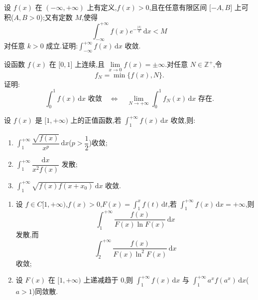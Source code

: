 \documentclass[../../数学分析培优讲义.tex]{subfiles}
\begin{document}
\begin{example}
设 $f(x)$ 在 $(-\infty,+\infty)$ 上有定义,$f(x)>0$,且在任意有限区间 $\lbrack -A,B\rbrack$ 上可积($A,B>0$);又有定数 $M$,使得
\[
    \int_{-\infty}^{+\infty}f(x)e^{-\frac{|x|}{k}}\,\mathrm{d}x<M
\]
对任意 $k>0$ 成立.证明:$\displaystyle\int_{-\infty}^{+\infty}f(x)\,\mathrm{d}x$ 收敛.
\end{example}
\exampleblank

\begin{example}
设函数 $f(x)$ 在 $\lbrack 0,1\rbrack$ 上连续,且 $\displaystyle\lim\limits_{x\to0}f(x)=\pm\infty$.对任意 $N\in\mathbb{Z}^+$,令
\[
    f_N=\min\{f(x),N\}.
\]
证明:
\[
    \int_0^1f(x)\,\mathrm{d}x\text{ 收敛}
    \quad\Longleftrightarrow\quad
    \lim\limits_{N\to+\infty}\int_0^1f_N(x)\,\mathrm{d}x\text{ 存在}.
\]
\end{example}
\exampleblank

\begin{example}
设 $f(x)$ 是 $\lbrack 1,+\infty)$ 上的正值函数,若 $\displaystyle\int_1^{+\infty}f(x)\,\mathrm{d}x$ 收敛,则:
\begin{enumerate}[label=(\arabic*)]
    \item $\displaystyle\int_1^{+\infty}\dfrac{\sqrt{f(x)}}{x^p}\,\mathrm{d}x$($p>\dfrac{1}{2}$)收敛;
    \item $\displaystyle\int_1^{+\infty}\dfrac{\mathrm{d}x}{x^2f(x)}$ 发散;
    \item $\displaystyle\int_1^{+\infty}\sqrt{f(x)f(x+x_0)}\,\mathrm{d}x$ 收敛.
\end{enumerate}
\end{example}
\exampleblank

\begin{example}
\begin{enumerate}[label=(\arabic*)]
    \item 设 $f\in C\lbrack 1,+\infty)$,$f(x)>0$,$\displaystyle F(x)=\int_1^xf(t)\,\mathrm{d}t$,若 $\displaystyle\int_1^{+\infty}f(x)\,\mathrm{d}x=+\infty$,则
    \[
        \int_1^{+\infty}\dfrac{f(x)}{F(x)\ln F(x)}\,\mathrm{d}x
    \]
    发散,而
    \[
        \int_2^{+\infty}\dfrac{f(x)}{F(x)\ln^2F(x)}\,\mathrm{d}x
    \]
    收敛;
    \item 设 $F(x)$ 在 $\lbrack 1,+\infty)$ 上递减趋于 $0$,则 $\displaystyle\int_1^{+\infty}f(x)\,\mathrm{d}x$ 与 $\displaystyle\int_1^{+\infty}a^xf(a^x)\,\mathrm{d}x$($a>1$)同敛散.
\end{enumerate}
\end{example}
\exampleblank
\end{document}
